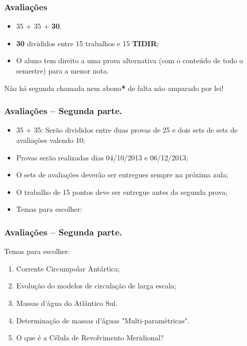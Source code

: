 \begin{frame}
    \frametitle{Avaliações}
    \begin{itemize}[<+-| alert@+>]
        \item 35 + 35 + {\bf 30}.
        \item {\bf 30} divididos entre 15 trabalhos e 15 {\bf TIDIR};
        \item O aluno tem direito a uma prova alternativa (com o conteúdo de
              todo o semestre) para a menor nota.
    \end{itemize}
    \pause
    \begin{block}{}
        Não há segunda chamada{\bf *} nem abono{\bf **}
        de falta não amparado por lei!
    \end{block}
    \pause
\end{frame}

\begin{frame}
    \frametitle{Avaliações -- Segunda parte.}
    \begin{itemize}[<+-| alert@+>]
        \item 35 + 35: Serão divididos entre duas provas de 25 e dois sets de sets de avaliações valendo 10;
        \item Provas serão realizadas dias 04/10/2013 e 06/12/2013;
        \item O sets de avaliações deverão ser entregues sempre na próxima aula;
        \item O trabalho de 15 pontos deve ser entregue antes da segunda prova;
        \item Temas para escolher:
    \end{itemize}
\end{frame}

\begin{frame}
    \frametitle{Avaliações -- Segunda parte.}
        \begin{block}{}
        Temas para escolher:
        \end{block}
            {\scriptsize
            \begin{enumerate}[<+-| alert@+>]
                \item Corrente Circumpolar Antártica;
                \item Evolução do modelos de circulação de larga escala;
                \item Massas d'água do Atlântico Sul.
                \item Determinação de massas d'águas "Multi-paramétricas".
                \item O que é a Célula de Revolvimento Meridional?
            \end{enumerate}
            }
\end{frame}

